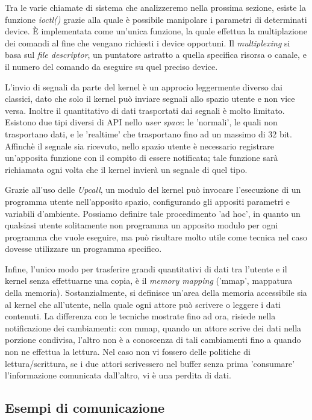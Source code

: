 Tra le varie chiamate di sistema che analizzeremo nella prossima sezione, esiste la funzione \emph{ioctl()} grazie alla quale è possibile manipolare i parametri di determinati device. È implementata come un'unica funzione, la quale effettua la multiplazione dei comandi al fine che vengano richiesti i device opportuni. Il \emph{multiplexing} si basa sul \emph{file descriptor}, un puntatore astratto a quella specifica risorsa o canale, e il numero del comando da eseguire su quel preciso device.

L'invio di segnali da parte del kernel è un approcio leggermente diverso dai classici, dato che solo il kernel può inviare segnali allo spazio utente e non vice versa. Inoltre il quantitativo di dati trasportati dai segnali è molto limitato. Esistono due tipi diversi di API nello \emph{user space}: le 'normali', le quali non trasportano dati, e le 'realtime' che trasportano fino ad un massimo di 32 bit.
Affinchè il segnale sia ricevuto, nello spazio utente è necessario registrare un'apposita funzione con il compito di essere notificata; tale funzione sarà richiamata ogni volta che il kernel invierà un segnale di quel tipo.

Grazie all'uso delle \emph{Upcall}, un modulo del kernel può invocare l'esecuzione di un programma utente nell'apposito spazio, configurando gli appositi parametri e variabili d'ambiente. Possiamo definire tale procedimento 'ad hoc', in quanto un qualsiasi utente solitamente non programma un apposito modulo per ogni programma che vuole eseguire, ma può risultare molto utile come tecnica nel caso dovesse utilizzare un programma specifico.

Infine, l'unico modo per trasferire grandi quantitativi di dati tra l'utente e il kernel senza effettuarne una copia, è il \emph{memory mapping} ('mmap', mappatura della memoria). Sostanzialmente, si definisce un'area della memoria accessibile sia al kernel che all'utente, nella quale ogni attore può scrivere o leggere i dati contenuti. La differenza con le tecniche mostrate fino ad ora, risiede nella notificazione dei cambiamenti: con mmap, quando un attore scrive dei dati nella porzione condivisa, l'altro non è a conoscenza di tali cambiamenti fino a quando non ne effettua la lettura. Nel caso non vi fossero delle politiche di lettura/scrittura, se i due attori scrivessero nel buffer senza prima 'consumare' l'informazione comunicata dall'altro, vi è una perdita di dati.

\subsection{Esempi di comunicazione}

